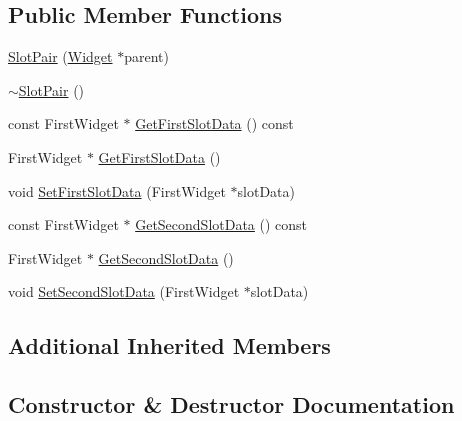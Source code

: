 \subsection*{Public Member Functions}
\begin{DoxyCompactItemize}
\item 
\mbox{\hyperlink{classngl__gui_1_1_slot_pair_a6a58463dca6a44e8d84e79cb1ad18d1d}{Slot\+Pair}} (\mbox{\hyperlink{classngl__gui_1_1_widget}{Widget}} $\ast$parent)
\item 
\mbox{\hyperlink{classngl__gui_1_1_slot_pair_ae92ee1fe2988c034bee83f75c22d425c}{$\sim$\+Slot\+Pair}} ()
\item 
const First\+Widget $\ast$ \mbox{\hyperlink{classngl__gui_1_1_slot_pair_ac8ffede6a37fa6af0f6bd837779e6180}{Get\+First\+Slot\+Data}} () const
\item 
First\+Widget $\ast$ \mbox{\hyperlink{classngl__gui_1_1_slot_pair_a364faa95ab9eb3bb8e613485d8d5d772}{Get\+First\+Slot\+Data}} ()
\item 
void \mbox{\hyperlink{classngl__gui_1_1_slot_pair_a478861c7f2deabdf0d7dcb00b421e0f4}{Set\+First\+Slot\+Data}} (First\+Widget $\ast$slot\+Data)
\item 
const First\+Widget $\ast$ \mbox{\hyperlink{classngl__gui_1_1_slot_pair_a9708577c1867d14bd415fd6b923a802f}{Get\+Second\+Slot\+Data}} () const
\item 
First\+Widget $\ast$ \mbox{\hyperlink{classngl__gui_1_1_slot_pair_acd83d80b4c4ea7de7c9bc54625294f03}{Get\+Second\+Slot\+Data}} ()
\item 
void \mbox{\hyperlink{classngl__gui_1_1_slot_pair_aa9df61a55cf75ff986576fabf2ad17ef}{Set\+Second\+Slot\+Data}} (First\+Widget $\ast$slot\+Data)
\end{DoxyCompactItemize}
\subsection*{Additional Inherited Members}


\subsection{Constructor \& Destructor Documentation}
\mbox{\label{classngl__gui_1_1_slot_pair_a6a58463dca6a44e8d84e79cb1ad18d1d}} 
